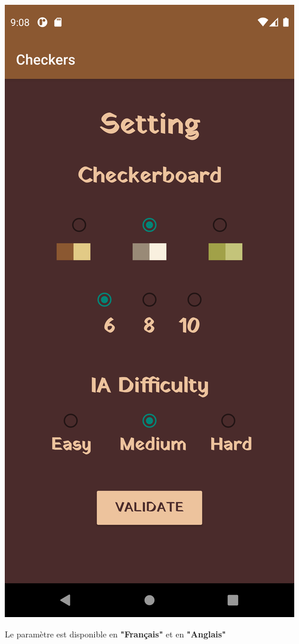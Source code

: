 \documentclass{beamer}
\begin{document}
\begin{frame}
\begin{center}
    \includegraphics[scale=0.05]{setting_en.png}
  \end{center}

  Le paramètre est disponible en \textbf{"Français"} et en \textbf{"Anglais"}

\end{frame}
\end{document}
